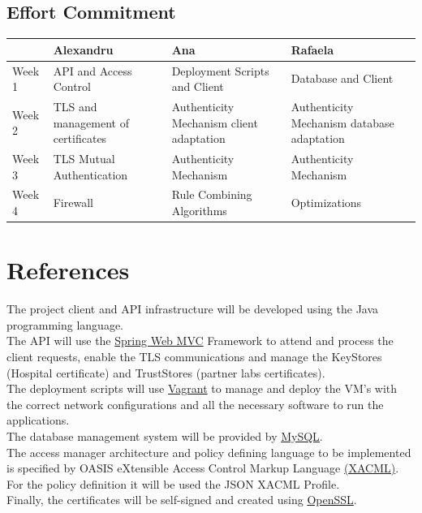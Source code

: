 \subsection{Effort Commitment}

\begin{tabularx}{0.8\textwidth} { 
  | >{\centering\arraybackslash}X 
  | >{\centering\arraybackslash}X 
  | >{\centering\arraybackslash}X 
  | >{\centering\arraybackslash}X | }
 \hline
  & Alexandru & Ana  & Rafaela \\
 \hline
 Week 1  & API and Access Control  & Deployment Scripts and Client  & Database and Client \\
  \hline
  Week 2  & TLS and management of certificates  & Authenticity Mechanism client adaptation  & Authenticity Mechanism database adaptation \\
   \hline
   Week 3  & TLS Mutual Authentication  & Authenticity Mechanism  & Authenticity Mechanism \\
    \hline
    Week 4  & Firewall  & Rule Combining Algorithms  & Optimizations \\
\hline
\end{tabularx}

\section{References}

The project client and API infrastructure will be developed using the Java programming language. \\

The API will use the \href{https://docs.spring.io/spring-framework/docs/3.2.x/spring-framework-reference/html/mvc.html}{Spring Web MVC} Framework to attend and process the client requests, enable the TLS communications and manage the KeyStores (Hospital certificate) and TrustStores (partner labs certificates). \\

The deployment scripts will use \href{https://www.vagrantup.com/}{Vagrant} to manage and deploy the VM's with the correct network configurations and all the necessary software to run the applications. \\

The database management system will be provided by \href{https://www.mysql.com/}{MySQL}. \\

The access manager architecture and policy defining language to be implemented is specified by OASIS eXtensible Access Control Markup Language \href{https://www.oasis-open.org/committees/tc_home.php?wg_abbrev=xacml#other}{(XACML)}. For the policy definition it will be used the JSON XACML Profile. \\

Finally, the certificates will be self-signed and created using \href{https://www.openssl.org/}{OpenSSL}. \\
